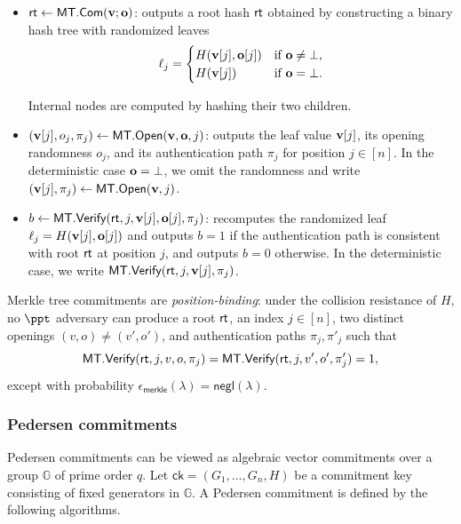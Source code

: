 \begin{itemize}
\item $\textsf{rt} \gets \textsf{MT.Com}(\mathbf{v};\mathbf{o})$:
outputs a root hash $\textsf{rt}$ obtained by constructing a binary hash tree with
randomized leaves
\[
\ell_j =
\begin{cases}
  H(\mathbf{v}[j], \mathbf{o}[j]) & \text{if } \mathbf{o}\neq\bot,\\
  H(\mathbf{v}[j]) & \text{if } \mathbf{o}=\bot.
\end{cases}
\]

Internal nodes are computed by hashing their two children.

\item $(\mathbf{v}[j],o_j,\pi_j) \gets \textsf{MT.Open}(\mathbf{v},\mathbf{o},j)$:
outputs the leaf value $\mathbf{v}[j]$, its opening randomness $o_j$, and its
authentication path $\pi_j$ for position $j\in[n]$.
In the deterministic case \(\mathbf{o}=\bot\), we omit the randomness and write
\((\mathbf{v}[j],\pi_j)\gets\textsf{MT.Open}(\mathbf{v},j)\).

\item $b \gets \textsf{MT.Verify}(\textsf{rt},j,\mathbf{v}[j],\mathbf{o}[j],\pi_j)$:
recomputes the randomized leaf
$
  \ell_j = H(\mathbf{v}[j], \mathbf{o}[j])
$
and outputs $b=1$ if the authentication path is consistent with root $\textsf{rt}$ at
position $j$, and outputs $b=0$ otherwise.
In the deterministic case, we write
\(\textsf{MT.Verify}(\textsf{rt},j,\mathbf{v}[j],\pi_j)\).
\end{itemize}


Merkle tree commitments are \emph{position-binding}: under the collision
resistance of $H$, no $\ppt$ adversary can produce a root $\textsf{rt}$, an index
$j\in[n]$, two distinct openings $(v,o)\neq(v',o')$, and authentication paths
$\pi_j,\pi'_j$ such that
\[
  \textsf{MT.Verify}(\textsf{rt},j,v,o,\pi_j)
  =
  \textsf{MT.Verify}(\textsf{rt},j,v',o',\pi'_j)
  =
  1,
\]
except with probability
$\epsilon_{\mathsf{merkle}}(\lambda)=\mathsf{negl}(\lambda)$.



\subsubsection{Pedersen commitments}
Pedersen commitments can be viewed as algebraic vector commitments over a group $\mathbb{G}$ of prime order $q$. Let $\mathsf{ck}=(G_1,\ldots,G_n,H)$ be a commitment key consisting of fixed generators in $\mathbb{G}$. A Pedersen commitment is defined by the following algorithms.

